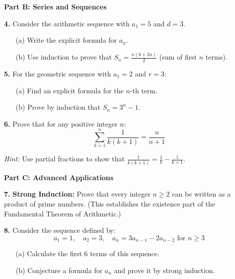 \documentclass[12pt]{article}
\begin{document}
\textbf{Part B: Series and Sequences}

\textbf{4.} Consider the arithmetic sequence with $a_1 = 5$ and $d = 3$.

\begin{enumerate}
\item[(a)] Write the explicit formula for $a_n$.
\vspace{2cm}

\item[(b)] Use induction to prove that $S_n = \frac{n(6 + 3n)}{2}$ (sum of first $n$ terms).
\vspace{4cm}
\end{enumerate}

\textbf{5.} For the geometric sequence with $a_1 = 2$ and $r = 3$:

\begin{enumerate}
\item[(a)] Find an explicit formula for the $n$-th term.
\vspace{2cm}

\item[(b)] Prove by induction that $S_n = 3^n - 1$.
\vspace{4cm}
\end{enumerate}

\textbf{6.} Prove that for any positive integer $n$:
$$\sum_{k=1}^{n} \frac{1}{k(k+1)} = \frac{n}{n+1}$$

\textit{Hint:} Use partial fractions to show that $\frac{1}{k(k+1)} = \frac{1}{k} - \frac{1}{k+1}$.
\vspace{5cm}

\textbf{Part C: Advanced Applications}

\textbf{7.} \textbf{Strong Induction:} Prove that every integer $n \geq 2$ can be written as a product of prime numbers. (This establishes the existence part of the Fundamental Theorem of Arithmetic.)
\vspace{5cm}

\textbf{8.} Consider the sequence defined by:
$$a_1 = 1, \quad a_2 = 3, \quad a_n = 3a_{n-1} - 2a_{n-2} \text{ for } n \geq 3$$

\begin{enumerate}
\item[(a)] Calculate the first 6 terms of this sequence.
\vspace{3cm}

\item[(b)] Conjecture a formula for $a_n$ and prove it by strong induction.
\vspace{5cm}
\end{enumerate}
\end{document}
